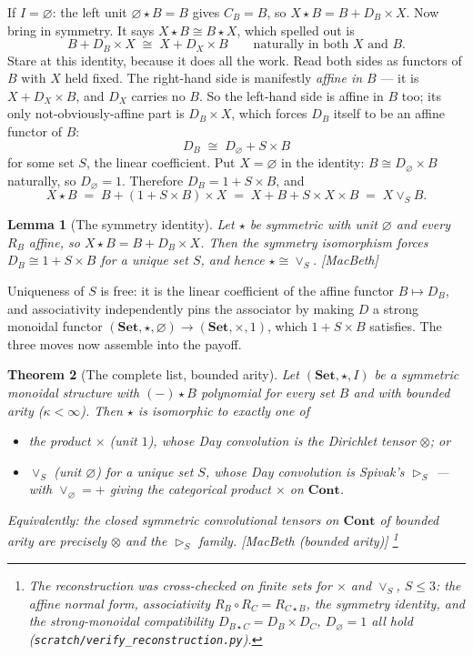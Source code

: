 \documentclass[11pt,a4paper]{book}
\newcommand{\Set}{\mathbf{Set}}
\newcommand{\Cont}{\mathbf{Cont}}
\theoremstyle{plain}
\newtheorem{Theorem}{Theorem}[chapter]
\newtheorem{Lemma}[Theorem]{Lemma}
\theoremstyle{definition}
\theoremstyle{remark}
\newcommand{\prov}[1]{\hfill\textsf{\footnotesize[#1]}}
\begin{document}
If $I=\varnothing$: the left unit $\varnothing\star B=B$ gives $C_B=B$, so
$X\star B=B+D_B\times X$. Now bring in symmetry. It says $X\star B\cong B\star X$,
which spelled out is
\[
   B + D_B\times X\;\cong\;X + D_X\times B\qquad\text{naturally in both $X$ and $B$.}
\]
Stare at this identity, because it does all the work. Read both sides as functors of
$B$ with $X$ held fixed. The right-hand side is manifestly \emph{affine in $B$} ---
it is $X+D_X\times B$, and $D_X$ carries no $B$. So the left-hand side is affine in
$B$ too; its only not-obviously-affine part is $D_B\times X$, which forces $D_B$
itself to be an affine functor of $B$:
\[
   D_B\;\cong\;D_\varnothing + S\times B
\]
for some set $S$, the linear coefficient. Put $X=\varnothing$ in the identity:
$B\cong D_\varnothing\times B$ naturally, so $D_\varnothing=1$. Therefore
$D_B=1+S\times B$, and
\[
   X\star B\;=\;B+(1+S\times B)\times X\;=\;X+B+S\times X\times B\;=\;X\vee_S B.
\]

\begin{Lemma}[The symmetry identity]\label{lem:symid}
Let $\star$ be symmetric with unit $\varnothing$ and every $R_B$ affine, so
$X\star B=B+D_B\times X$. Then the symmetry isomorphism forces $D_B\cong 1+S\times B$
for a unique set $S$, and hence $\star\cong\vee_S$. \prov{MacBeth}
\end{Lemma}

Uniqueness of $S$ is free: it is the linear coefficient of the affine functor
$B\mapsto D_B$, and associativity independently pins the associator by making $D$ a
strong monoidal functor $(\Set,\star,\varnothing)\to(\Set,\times,1)$, which
$1+S\times B$ satisfies. The three moves now assemble into the payoff.

\begin{Theorem}[The complete list, bounded arity]\label{thm:classification}
Let $(\Set,\star,I)$ be a symmetric monoidal structure with $(-)\star B$ polynomial
for every set $B$ and with bounded arity ($\kappa<\infty$). Then $\star$ is
isomorphic to exactly one of
\begin{itemize}
\item the product $\times$ (unit $1$), whose Day convolution is the Dirichlet tensor
      $\otimes$; or
\item $\vee_S$ (unit $\varnothing$) for a unique set $S$, whose Day convolution is
      Spivak's $\rhd_S$ --- with $\vee_\varnothing=+$ giving the categorical product
      $\times$ on $\Cont$.
\end{itemize}
Equivalently: the closed symmetric convolutional tensors on $\Cont$ of bounded arity
are precisely $\otimes$ and the $\rhd_S$ family.
\prov{MacBeth (bounded arity)}%
\footnote{The reconstruction was cross-checked on finite sets for $\times$ and
$\vee_S$, $S\le 3$: the affine normal form, associativity
$R_B\circ R_C=R_{C\star B}$, the symmetry identity, and the strong-monoidal
compatibility $D_{B\star C}=D_B\times D_C$, $D_\varnothing=1$ all hold
(\texttt{scratch/verify\_reconstruction.py}).}
\end{Theorem}
\end{document}

